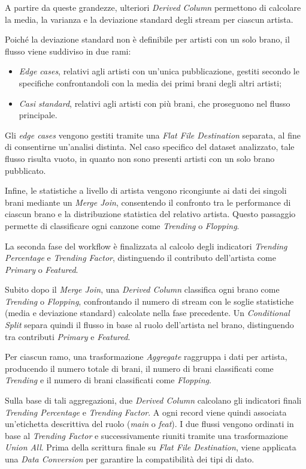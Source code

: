 A partire da queste grandezze, ulteriori \textit{Derived Column} permettono di calcolare la media, la varianza e la deviazione standard degli stream per ciascun artista.

Poiché la deviazione standard non è definibile per artisti con un solo brano, il flusso viene suddiviso in due rami:
\begin{itemize}
    \item \textit{Edge cases}, relativi agli artisti con un’unica pubblicazione, gestiti secondo le specifiche confrontandoli con la media dei primi brani degli altri artisti;
    \item \textit{Casi standard}, relativi agli artisti con più brani, che proseguono nel flusso principale.
\end{itemize}

Gli \textit{edge cases} vengono gestiti tramite una \textit{Flat File Destination} separata, al fine di consentirne un’analisi distinta. Nel caso specifico del dataset analizzato, tale flusso risulta vuoto, in quanto non sono presenti artisti con un solo brano pubblicato.

Infine, le statistiche a livello di artista vengono ricongiunte ai dati dei singoli brani mediante un \textit{Merge Join}, consentendo il confronto tra le performance di ciascun brano e la distribuzione statistica del relativo artista. Questo passaggio permette di classificare ogni canzone come \textit{Trending} o \textit{Flopping}.

La seconda fase del workflow è finalizzata al calcolo degli indicatori \textit{Trending Percentage} e \textit{Trending Factor}, distinguendo il contributo dell’artista come \textit{Primary} o \textit{Featured}.

Subito dopo il \textit{Merge Join}, una \textit{Derived Column} classifica ogni brano come \textit{Trending} o \textit{Flopping}, confrontando il numero di stream con le soglie statistiche (media e deviazione standard) calcolate nella fase precedente. Un \textit{Conditional Split} separa quindi il flusso in base al ruolo dell’artista nel brano, distinguendo tra contributi \textit{Primary} e \textit{Featured}.

Per ciascun ramo, una trasformazione \textit{Aggregate} raggruppa i dati per artista, producendo il numero totale di brani, il numero di brani classificati come \textit{Trending} e il numero di brani classificati come \textit{Flopping}.

Sulla base di tali aggregazioni, due \textit{Derived Column} calcolano gli indicatori finali \textit{Trending Percentage} e \textit{Trending Factor}. A ogni record viene quindi associata un’etichetta descrittiva del ruolo (\textit{main} o \textit{feat}). I due flussi vengono ordinati in base al \textit{Trending Factor} e successivamente riuniti tramite una trasformazione \textit{Union All}. Prima della scrittura finale su \textit{Flat File Destination}, viene applicata una \textit{Data Conversion} per garantire la compatibilità dei tipi di dato.

